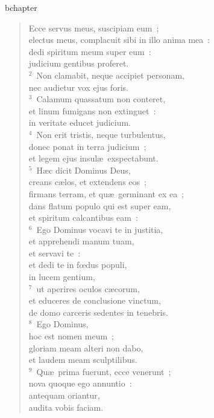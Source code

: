 bchapter\begin{verse}\vspace{-19pt}Ecce servus meus, suscipiam eum~;\\ electus meus, complacuit sibi in illo anima mea~:\\ dedi spiritum meum super eum~:\\ judicium gentibus proferet.\\
${}^{2}$~Non clamabit, neque accipiet personam,\\ nec audietur vox ejus foris.\\
${}^{3}$~Calamum quassatum non conteret,\\ et linum fumigans non extinguet~:\\ in veritate educet judicium.\\
${}^{4}$~Non erit tristis, neque turbulentus,\\ donec ponat in terra judicium~;\\ et legem ejus insul\ae\ exspectabunt.\\
${}^{5}$~H\ae c dicit Dominus Deus,\\ creans c\ae los, et extendens eos~;\\ firmans terram, et qu\ae\ germinant ex ea~;\\ dans flatum populo qui est super eam,\\ et spiritum calcantibus eam~:\\
${}^{6}$~Ego Dominus vocavi te in justitia,\\ et apprehendi manum tuam,\\ et servavi te~:\\ et dedi te in fœdus populi,\\ in lucem gentium,\\
${}^{7}$~ut aperires oculos c\ae corum,\\ et educeres de conclusione vinctum,\\ de domo carceris sedentes in tenebris.\\
${}^{8}$~Ego Dominus,\\ hoc est nomen meum~;\\ gloriam meam alteri non dabo,\\ et laudem meam sculptilibus.\\
${}^{9}$~Qu\ae\ prima fuerunt, ecce venerunt~;\\ nova quoque ego annuntio~:\\ antequam oriantur,\\ audita vobis faciam.\end{verse}


